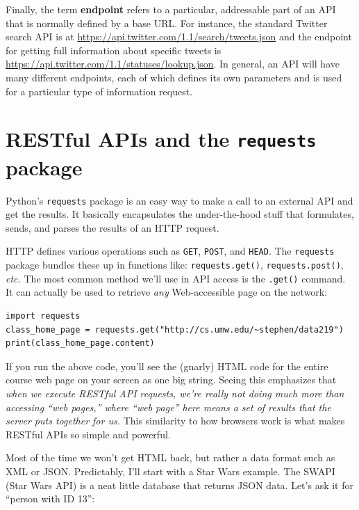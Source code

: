 Finally, the term \textbf{endpoint} refers to a particular, addressable part
of an API that is normally defined by a base URL. For instance, the standard
Twitter search API is at \url{https://api.twitter.com/1.1/search/tweets.json}
and the endpoint for getting full information about specific tweets is \url{
https://api.twitter.com/1.1/statuses/lookup.json}. In general, an API will
have many different endpoints, each of which defines its own parameters and is
used for a particular type of information request.

\section{RESTful APIs and the \texttt{requests} package}

Python's \texttt{requests} package is an easy way to make a call to an
external API and get the results. It basically encapsulates the under-the-hood
stuff that formulates, sends, and parses the results of an HTTP request.

HTTP defines various operations such as \texttt{GET}, \texttt{POST}, and
\texttt{HEAD}. The \texttt{requests} package bundles these up in functions
like: \texttt{requests.get()}, \texttt{requests.post()},
\textit{etc.} The most common method we'll use in API access is the
\texttt{.get()} command. It can actually be used to retrieve \textit{any}
Web-accessible page on the network:

\begin{Verbatim}[fontsize=\small,samepage=true,frame=single]
import requests
class_home_page = requests.get("http://cs.umw.edu/~stephen/data219")
print(class_home_page.content)
\end{Verbatim}

If you run the above code, you'll see the (gnarly) HTML code for the entire
course web page on your screen as one big string. Seeing this emphasizes that
\textit{when we execute RESTful API requests, we're really not doing much more
than accessing ``web pages,'' where ``web page'' here means a set of results
that the server puts together for us.} This similarity to how browsers work is
what makes RESTful APIs so simple and powerful.

Most of the time we won't get HTML back, but rather a data format such as XML
or JSON. Predictably, I'll start with a Star Wars example. The SWAPI (Star
Wars API) is a neat little database that returns JSON data. Let's ask it for
``person with ID 13'':

